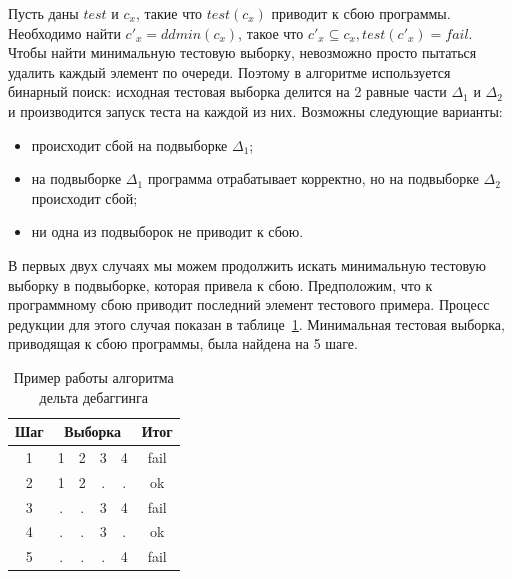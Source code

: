 Пусть даны $test$ и $c_x$, такие что $test(c_x)$ приводит к сбою программы. Необходимо найти $c'_x = ddmin(c_x)$, такое что $c'_x \subseteq c_x, test(c'_x) = fail$. Чтобы найти минимальную тестовую выборку, невозможно просто пытаться удалить каждый элемент по очереди. Поэтому в алгоритме используется бинарный поиск: исходная тестовая выборка делится на 2 равные части $\Delta_1$ и $\Delta_2$ и производится запуск теста на каждой из них. Возможны следующие варианты:
%
\begin{itemize}
\item происходит сбой на подвыборке $\Delta_1$;
\item на подвыборке $\Delta_1$ программа отрабатывает корректно, но на подвыборке $\Delta_2$ происходит сбой;
\item ни одна из подвыборок не приводит к сбою.
\end{itemize}
%
В первых двух случаях мы можем продолжить искать минимальную тестовую выборку в подвыборке, которая привела к сбою. Предположим, что к программному сбою приводит последний элемент тестового примера. Процесс редукции для этого случая показан в таблице~\ref{tab:ddminex}. Минимальная тестовая выборка, приводящая к сбою программы, была найдена на 5 шаге.
%
\begin{table}[]
\center
\captionsetup{skip=5pt}
\caption{\label{tab:ddminex}Пример работы алгоритма дельта дебаггинга}
\begin{tabular}{| c | *{4}{c} | c |}
\hline
\bf Шаг & \multicolumn{4}{|c|}{\bf Выборка} & {\bf Итог}\\
\hline
1 &  1 & 2 & 3 & 4 & fail \\
\hline
2 &  1 & 2 & . & . & ok \\
\hline
3 &  . & . & 3 & 4 & fail \\
\hline
4 &  . & . & 3 & . & ok \\
\hline
5 &  . & . & . & 4 & fail \\
\hline
\end{tabular}
\end{table}

